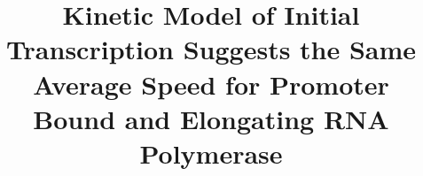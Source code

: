 \documentclass{bmcart}
\begin{document}
\begin{frontmatter}

\begin{fmbox}


\title{Kinetic Model of Initial Transcription Suggests the Same Average Speed
for Promoter Bound and Elongating RNA Polymerase}


\author[
   addressref={aff1},                   %
   email={jorgsk@nt.ntnu.no}   %
]{ }
\author[
   addressref={aff1},
   email={nadi.bar@ntnu.no}
]{ }


\address[id=aff1]{%
  , %
  ,                     %
  ,                              %
}


\end{fmbox}
\end{frontmatter}
\end{document}
